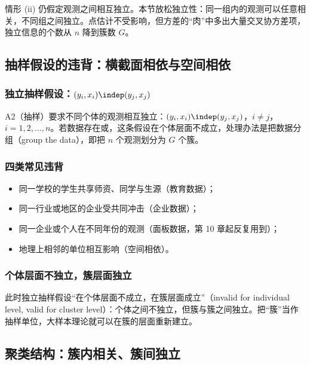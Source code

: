 情形 (ii) 仍假定观测之间相互独立。本节放松独立性：同一组内的观测可以任意相关，不同组之间独立。点估计不受影响，但方差的“肉”中多出大量交叉协方差项，独立信息的个数从 $n$ 降到簇数 $G$。

\subsection{\texorpdfstring{\iid}{i.i.d.} 抽样假设的违背：横截面相依与空间相依}

\subsubsection{独立抽样假设：\texorpdfstring{$(y_i,x_i)\indep(y_j,x_j)$}{(y\_i,x\_i) indep (y\_j,x\_j)}}

A2（\iid 抽样）要求不同个体的观测相互独立：$(y_i,x_i)\indep(y_j,x_j)$，$i\ne j$，$i=1,2,\dots,n$。若数据存在或，这条假设在个体层面不成立，处理办法是把数据分组（group the data），即把 $n$ 个观测划分为 $G$ 个簇。

\subsubsection{四类常见违背}

\begin{itemize}
\item 同一学校的学生共享师资、同学与生源（教育数据）；
\item 同一行业或地区的企业受共同冲击（企业数据）；
\item 同一企业或个人在不同年份的观测（面板数据，第 10 章起反复用到）；
\item 地理上相邻的单位相互影响（空间相依）。
\end{itemize}

\subsubsection{个体层面不独立，簇层面独立}

此时独立抽样假设“在个体层面不成立，在簇层面成立”（invalid for individual level, valid for cluster level）：个体之间不独立，但簇与簇之间独立。把“簇”当作抽样单位，大样本理论就可以在簇的层面重新建立。

\subsection{聚类结构：簇内相关、簇间独立}

